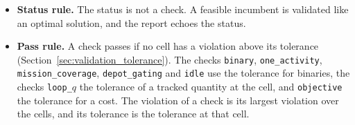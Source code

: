 \tabend

\begin{itemize}[nosep]
  \item \textbf{Status rule.} The status is not a check. A feasible incumbent is validated like an optimal solution, and the report echoes the status.
  \item \textbf{Pass rule.} A check passes if no cell has a violation above its tolerance (Section~\ref{sec:validation_tolerance}). The checks \texttt{binary}, \texttt{one\_activity}, \texttt{mission\_coverage}, \texttt{depot\_gating} and \texttt{idle} use the tolerance for binaries, the checks \texttt{loop\_}$q$ the tolerance of a tracked quantity at the cell, and \texttt{objective} the tolerance for a cost. The violation of a check is its largest violation over the cells, and its tolerance is the tolerance at that cell.
\end{itemize}

